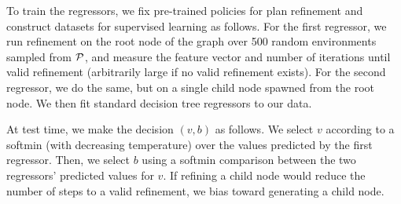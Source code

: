 To train the regressors, we fix pre-trained policies for plan refinement and construct datasets
for supervised learning as follows. For the first regressor, we run refinement on the root
node of the graph over 500 random environments sampled from $\mathcal{P}$, and measure the feature vector and number of iterations
until valid refinement (arbitrarily large if no valid refinement exists).
For the second regressor, we do the same, but on a single child node spawned from the root node.
We then fit standard decision tree regressors to our data.

At test time, we make the decision $(v, b)$ as follows. We select $v$ according to a softmin (with decreasing temperature) over the values
predicted by the first regressor. Then, we select $b$ using a softmin comparison between the two regressors'
predicted values for $v$. If refining a child node would reduce the number of steps to a valid refinement,
we bias toward generating a child node.
